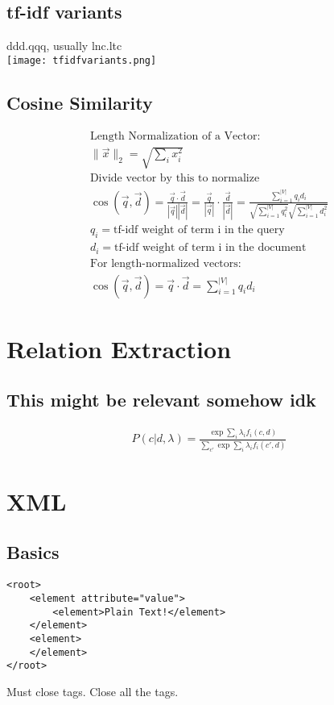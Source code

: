 \documentclass[10pt,twocolumn]{amsart}
\begin{document}
\subsection{tf-idf variants} ddd.qqq, usually lnc.ltc \\
\texttt{[image: tfidfvariants.png]}
\subsection{Cosine Similarity}
\begin{gather*}
\text{Length Normalization of a Vector:} \\
\lVert\vec{x}\rVert_{2} = \sqrt{\sum_{i}x_{i}^{2}} \\
\text{Divide vector by this to normalize} \\
\cos \left(\vec{q}, \vec{d}\right) =
 \frac{\vec{q} \cdot \vec{d}}{|\vec{q}||\vec{d}|} = 
\frac{\vec{q}}{|\vec{q}|} \cdot \frac{\vec{d}}{|\vec{d}|} =
\frac{\sum_{i=1}^{|V|} q_{i}d_{i}}{\sqrt{\sum_{i=1}^{|V|}q_{i}^{2}}
\sqrt{\sum_{i=1}^{|V|}d_{i}^{2}}} \\
q_i = \text{tf-idf weight of term i in the query} \\
d_i = \text{tf-idf weight of term i in the document} \\
\text{For length-normalized vectors: } \\
\cos\left(\vec{q}, \vec{d}\right) = \vec{q} \cdot \vec{d} = \sum_{i=1}^{|V|} q_id_i
\end{gather*}
\section{Relation Extraction}
\subsection{This might be relevant somehow idk}
\begin{gather*}
P(c|d, \lambda) = \frac{\exp \sum_{i} \lambda_{i} f_{i}(c,d)}
                       {\sum_{c'} \exp \sum_{i}\lambda_{i}f_{i}(c',d)}
\end{gather*}
\section{XML}
\subsection{Basics}
\begin{verbatim}
<root>
    <element attribute="value">
        <element>Plain Text!</element>
    </element>
    <element>
    </element>
</root>
\end{verbatim}
Must close tags. Close all the tags.
\end{document}
